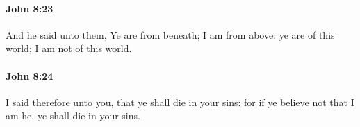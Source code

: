 		\paragraph{John 8:23} %
			\label{JOHN-8-23}

			And he said unto them, Ye are from beneath; I am from above: ye are of this world; I am not of this world.

			\begin{framed}
				\scriptsize
				\begin{compactdesc}
					\item[SBLG] 
				\end{compactdesc}
			\end{framed}

		\paragraph{John 8:24} %
			\label{JOHN-8-24}

			I said therefore unto you, that ye shall die in your sins: for if ye believe not that I am he, ye shall die in your sins.

